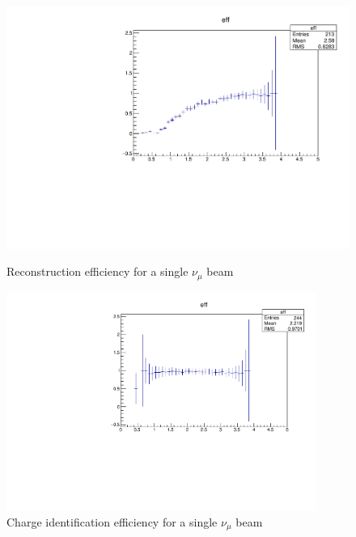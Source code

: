 \begin{figure}[h!]
	\begin{minipage}{0.49\linewidth}
		\centerline{\includegraphics[width=0.9\linewidth]{figures/muNeutrinoFitted.pdf}}
			\caption[]{Reconstruction efficiency for a single $\nu_{\mu}$ beam}
		\label{fig:numufitted}
	\end{minipage}
	\hfill
	\begin{minipage}{0.49\linewidth}
		\centerline{\includegraphics[width=0.9\textwidth]{figures/muNeutrinochargeID.pdf}}
		\caption[]{Charge identification efficiency for a single  $\nu_{\mu}$ beam}
		\label{fig:numucharge}
	\end{minipage}
\end{figure}

